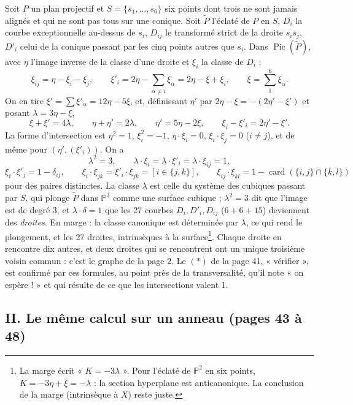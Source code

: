 \documentclass[11pt,a4paper]{article}
\begin{document}
Soit $P$ un plan projectif et $S = \lbrace s_1, \ldots, s_6\rbrace$ six points
dont trois ne sont jamais alignés et qui ne sont pas tous sur une conique. Soit
$\widetilde P$ l'éclaté de $P$ en $S$, $D_i$ la courbe exceptionnelle
au-dessus de $s_i$, $D_{ij}$ le transformé strict de la droite $s_i s_j$, $D'_i$
celui de la conique passant par les cinq points autres que $s_i$. Dans
$\operatorname{Pic}(\widetilde P)$, avec $\eta$ l'image inverse de la classe
d'une droite et $\xi_i$ la classe de $D_i$ :
\[
\xi_{ij} = \eta - \xi_i - \xi_j, \qquad \xi'_i = 2\eta - \sum_{\alpha \neq i}
\xi_\alpha = 2\eta - \xi + \xi_i, \qquad \xi = \sum_1^6 \xi_\alpha .
\]
On en tire $\xi' = \sum \xi'_\alpha = 12\eta - 5\xi$, et, définissant $\eta'$
par $2\eta - \xi = -(2\eta' - \xi')$ et posant $\lambda = 3\eta - \xi$,
\[
\xi + \xi' = 4\lambda, \qquad \eta + \eta' = 2\lambda, \qquad \eta' = 5\eta -
2\xi, \qquad \xi_i - \xi'_i = 2\eta' - \xi' .
\]
La forme d'intersection est $\eta^2 = 1$, $\xi_i^2 = -1$, $\eta \cdot \xi_i = 0$,
$\xi_i \cdot \xi_j = 0$ ($i \neq j$), et de même pour $(\eta', (\xi'_i))$. On a
\[
\lambda^2 = 3, \qquad \lambda \cdot \xi_i = \lambda \cdot \xi'_i = \lambda \cdot
\xi_{ij} = 1 ,
\]
\[
\xi_i \cdot \xi'_j = 1 - \delta_{ij}, \qquad \xi_i \cdot \xi_{jk} = \xi'_i \cdot
\xi_{jk} = [i \in \lbrace j, k\rbrace], \qquad \xi_{ij} \cdot \xi_{kl} = 1 -
\operatorname{card}(\lbrace i,j\rbrace \cap \lbrace k, l\rbrace)
\]
pour des paires distinctes. La classe $\lambda$ est celle du système des
cubiques passant par $S$, qui plonge $\widetilde P$ dans $\mathbb{P}^3$ comme
une surface cubique ; $\lambda^2 = 3$ dit que l'image est de degré 3, et
$\lambda \cdot \delta = 1$ que les 27 courbes $D_i, D'_i, D_{ij}$ ($6 + 6 +
15$) deviennent des \emph{droites}. En marge : la classe canonique est
déterminée par $\lambda$, ce qui rend le plongement, et les 27 droites,
intrinsèques à la surface\footnote{La marge écrit « $K = -3\lambda$ ». Pour
l'éclaté de $\mathbb{P}^2$ en six points, $K = -3\eta + \xi = -\lambda$ : la
section hyperplane est anticanonique. La conclusion de la marge (intrinsèque à
$X$) reste juste.}. Chaque droite en rencontre dix autres, et deux droites qui
se rencontrent ont un unique troisième voisin commun : c'est le graphe de la
page 2. Le $(\ast)$ de la page 41, « vérifier », est confirmé par ces
formules, au point près de la transversalité, qu'il note « on espère ! » et
qui résulte de ce que les intersections valent 1.

\subsection*{II. Le même calcul sur un anneau (pages 43 à 48)}
\end{document}
